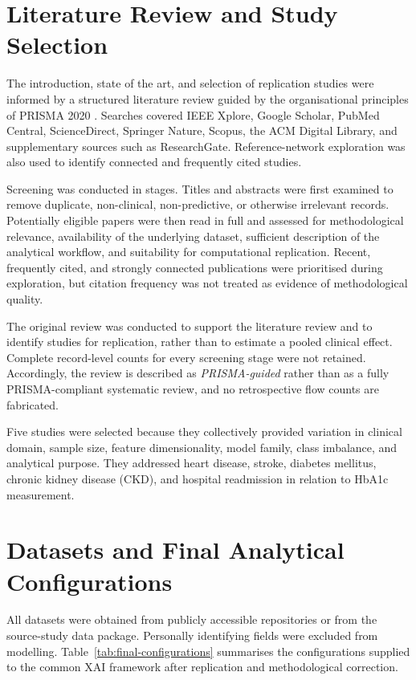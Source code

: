 \section{Literature Review and Study Selection}

The introduction, state of the art, and selection of replication studies were informed by a structured literature review guided by the organisational principles of PRISMA 2020 \citep{page_prisma_2021}. Searches covered IEEE Xplore, Google Scholar, PubMed Central, ScienceDirect, Springer Nature, Scopus, the ACM Digital Library, and supplementary sources such as ResearchGate. Reference-network exploration was also used to identify connected and frequently cited studies.

Screening was conducted in stages. Titles and abstracts were first examined to remove duplicate, non-clinical, non-predictive, or otherwise irrelevant records. Potentially eligible papers were then read in full and assessed for methodological relevance, availability of the underlying dataset, sufficient description of the analytical workflow, and suitability for computational replication. Recent, frequently cited, and strongly connected publications were prioritised during exploration, but citation frequency was not treated as evidence of methodological quality.

The original review was conducted to support the literature review and to identify studies for replication, rather than to estimate a pooled clinical effect. Complete record-level counts for every screening stage were not retained. Accordingly, the review is described as \emph{PRISMA-guided} rather than as a fully PRISMA-compliant systematic review, and no retrospective flow counts are fabricated.

Five studies were selected because they collectively provided variation in clinical domain, sample size, feature dimensionality, model family, class imbalance, and analytical purpose. They addressed heart disease, stroke, diabetes mellitus, chronic kidney disease (CKD), and hospital readmission in relation to HbA1c measurement.

\section{Datasets and Final Analytical Configurations}

All datasets were obtained from publicly accessible repositories or from the source-study data package. Personally identifying fields were excluded from modelling. Table~\ref{tab:final-configurations} summarises the configurations supplied to the common XAI framework after replication and methodological correction.


